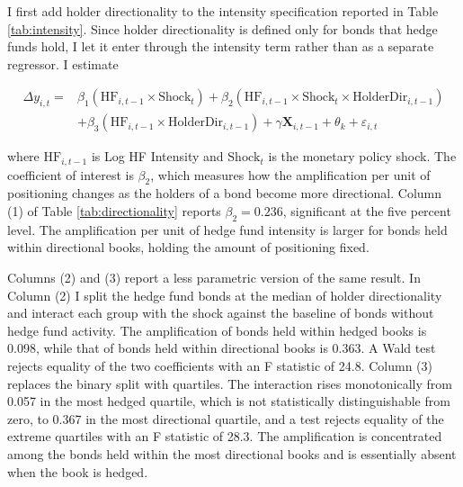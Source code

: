 \documentclass[english, 11pt, oneside]{article}
\begin{document}
I first add holder directionality to the intensity specification reported in Table \ref{tab:intensity}. Since holder directionality is defined only for bonds that hedge funds hold, I let it enter through the intensity term rather than as a separate regressor. I estimate

\begin{equation}
\begin{split}
\Delta y_{i,t} = {} & \beta_1 (\text{HF}_{i,t-1} \times \text{Shock}_{t}) + \beta_2 (\text{HF}_{i,t-1} \times \text{Shock}_{t} \times \text{HolderDir}_{i,t-1}) \\
& + \beta_3 (\text{HF}_{i,t-1} \times \text{HolderDir}_{i,t-1}) + \gamma \mathbf{X}_{i,t-1} + \theta_{k} + \varepsilon_{i,t}
\end{split}
\end{equation}

\noindent where $\text{HF}_{i,t-1}$ is Log HF Intensity and $\text{Shock}_{t}$ is the monetary policy shock. The coefficient of interest is $\beta_2$, which measures how the amplification per unit of positioning changes as the holders of a bond become more directional. Column (1) of Table \ref{tab:directionality} reports $\beta_2 = 0.236$, significant at the five percent level. The amplification per unit of hedge fund intensity is larger for bonds held within directional books, holding the amount of positioning fixed.

Columns (2) and (3) report a less parametric version of the same result. In Column (2) I split the hedge fund bonds at the median of holder directionality and interact each group with the shock against the baseline of bonds without hedge fund activity. The amplification of bonds held within hedged books is 0.098, while that of bonds held within directional books is 0.363. A Wald test rejects equality of the two coefficients with an F statistic of 24.8. Column (3) replaces the binary split with quartiles. The interaction rises monotonically from 0.057 in the most hedged quartile, which is not statistically distinguishable from zero, to 0.367 in the most directional quartile, and a test rejects equality of the extreme quartiles with an F statistic of 28.3. The amplification is concentrated among the bonds held within the most directional books and is essentially absent when the book is hedged.
\end{document}
